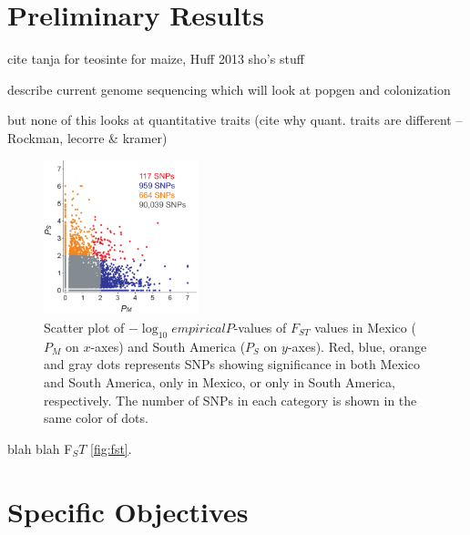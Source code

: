 \section*{Preliminary Results}

cite tanja for teosinte
for maize, Huff 2013
sho’s stuff

describe current genome sequencing which will look at popgen and colonization

but none of this looks at quantitative traits (cite why quant. traits are different -- Rockman, lecorre \& kramer)

\begin{figure}
  \centering
   \includegraphics[width=0.4\textwidth]{fst.pdf}
  \caption{Scatter plot of $-\log_10 empirical P$-values of $F_{ST}$ values in Mexico ($P_M$ on $x$-axes) and South America ($P_S$ on $y$-axes).   Red, blue, orange and gray dots represents SNPs showing significance in both Mexico and South America, only in Mexico, or only in South America, respectively.  The number of SNPs in each category is shown in the same color of dots.} 
\end{figure}


blah blah F$_ST$ \ref{fig:fst}.

\section*{Specific Objectives}


\renewcommand{\thesection}{Aim \arabic{section}}
